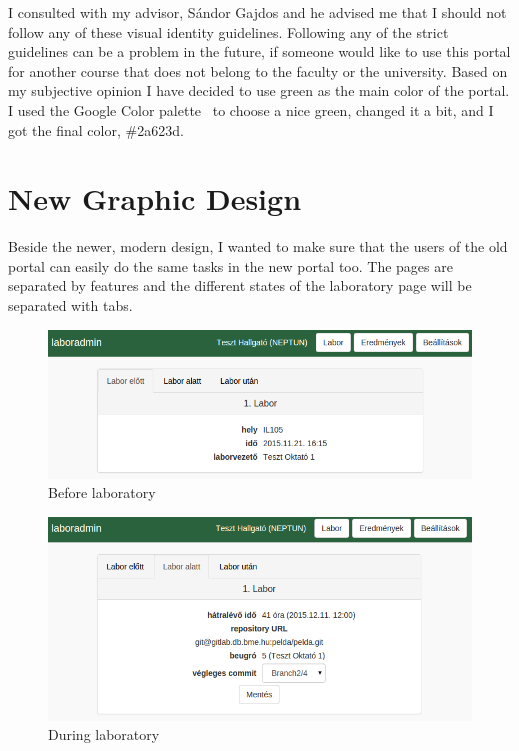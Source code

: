 I consulted with my advisor, Sándor Gajdos and he advised me that I should not follow any of these visual identity guidelines. Following any of the strict guidelines can be a problem in the future, if someone would like to use this portal for another course that does not belong to the faculty or the university. Based on my subjective opinion I have decided to use green as the main color of the portal. I used the Google Color palette~\cite{google-color-chart} to choose a nice green, changed it a bit, and I got the final color, \#2a623d.

\section{New Graphic Design}

Beside the newer, modern design, I wanted to make sure that the users of the old portal can easily do the same tasks in the new portal too. The pages are separated by features and the different states of the laboratory page will be separated with tabs.

\begin{figure}[!ht]
	\includegraphics[width=\textwidth]{figures/design/labor_elott.png}
	\caption{Before laboratory}
	\label{fig:before}
\end{figure}

\begin{figure}[!ht]
	\includegraphics[width=\textwidth]{figures/design/labor_alatt.png}
	\caption{During laboratory}
	\label{fig:during}
\end{figure}



